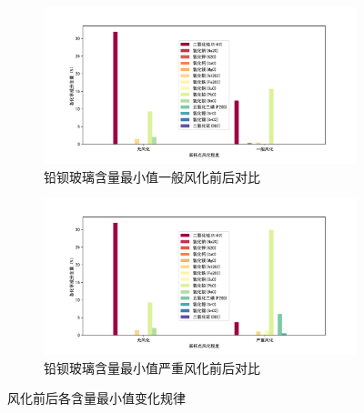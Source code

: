 \documentclass[withoutpreface,bwprint]{cumcmthesis} %
\begin{document}
\begin{figure}[!htb]
    \centering
    \begin{subfigure}{0.4\textwidth}
        \centering
        \includegraphics[scale=0.25]{铅钡玻璃含量最小值一般风化前后对比.pdf}
        \caption{铅钡玻璃含量最小值一般风化前后对比}
    \end{subfigure}
    \begin{subfigure}{0.4\textwidth}
        \centering
        \includegraphics[scale=0.25]{铅钡玻璃含量最小值严重风化前后对比.pdf}
        \caption{铅钡玻璃含量最小值严重风化前后对比}
    \end{subfigure}
    \caption{风化前后各含量最小值变化规律}
    \label{fig:1}
\end{figure}
\end{document}
